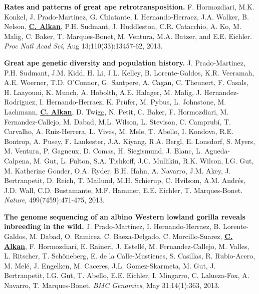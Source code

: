  \vspace{-.2cm}        
        {\bf Rates and patterns of great ape retrotransposition.}
        F. Hormozdiari, M.K. Konkel, J. Prado-Martinez, G. Chiatante, I. Hernando-Herraez, J.A. Walker, B. Nelson, {\bf {\underline {C. Alkan}}}, P.H. Sudmant, J. Huddleston, C.R. Catacchio, A. Ko, 
        M. Malig, C. Baker, T. Marques-Bonet, M. Ventura, M.A. Batzer, and E.E. Eichler. 
        {\em Proc Natl Acad Sci}, Aug 13;110(33):13457-62, 2013.
                             

 \vspace{-.2cm}
        {\bf Great ape genetic diversity and population history.}
        J. Prado-Martinez, P.H. Sudmant, J.M. Kidd, H. Li, J.L. Kelley, B. Lorente-Galdos, K.R. Veeramah, A.E. Woerner, T.D. O’Connor, G. Santpere, A. Cagan, C. Theunert, F. Casals, H. Laayouni, K. Munch, A. Hobolth, A.E. Halager, M. Malig, J. Hernandez-Rodriguez, I. Hernando-Herraez, K. Prüfer, M. Pybus, L. Johnstone, M. Lachmann, {\bf {\underline {C. Alkan}}}, D. Twigg, N. Petit, C. Baker, F. Hormozdiari, M. Fernandez-Callejo, M. Dabad, M.L. Wilson, L. Stevison, C. Camprubí, T. Carvalho, A. Ruiz-Herrera, L. Vives, M. Mele, T. Abello, I. Kondova, R.E. Bontrop, A. Pusey, F. Lankester, J.A. Kiyang, R.A. Bergl, E. Lonsdorf, S. Myers, M. Ventura, P. Gagneux, D. Comas, H. Siegismund, J. Blanc, L. Agueda-Calpena, M. Gut, L. Fulton, S.A. Tishkoff, J.C. Mullikin, R.K. Wilson, I.G. Gut, M. Katherine Gonder, O.A. Ryder, B.H. Hahn, A. Navarro, J.M. Akey, J. Bertranpetit, D. Reich, T. Mailund, M.H. Schierup, C. Hvilsom, A.M. Andrés, J.D. Wall, C.D. Bustamante, M.F. Hammer, E.E. Eichler, T. Marques-Bonet. 
        {\em Nature}, 499(7459):471-475, 2013.


 \vspace{-.2cm}
        {\bf The genome sequencing of an albino Western lowland gorilla reveals inbreeding in the wild.}
        J. Prado-Martinez, I. Hernando-Herraez, B. Lorente-Galdos, M. Dabad, O. Ramirez, C. Baeza-Delgado, C. Morcillo-Suarez, 
        {\bf {\underline {C. Alkan}}}, F. Hormozdiari, E. Raineri, J. Estellé, M. Fernandez-Callejo, M. Valles, L. Ritscher, T. Schöneberg, E. de la Calle-Mustienes, 
        S. Casillas, R. Rubio-Acero, M. Melé, J. Engelken, M. Caceres, J.L. Gomez-Skarmeta, M. Gut, J. Bertranpetit, I.G. Gut, T. Abello, 
        E.E. Eichler, I. Mingarro, C. Lalueza-Fox, A. Navarro, T. Marques-Bonet.
        {\em BMC Genomics}, May 31;14(1):363, 2013.


        \clearpage
        
